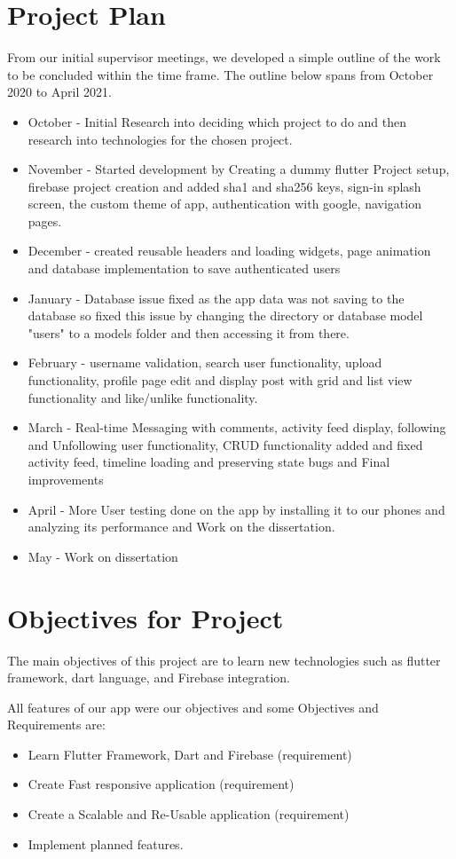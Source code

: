 \section{Project Plan}
From our initial supervisor meetings, we developed a simple outline of the work to be concluded within the time frame. The outline below spans from October 2020 to April 2021.
\begin{itemize}
\item October - Initial Research into deciding which project to do and then research into technologies for the chosen project.
\item November - Started development by Creating a dummy flutter Project setup, firebase project creation and added sha1 and sha256 keys, sign-in splash screen, the custom theme of app, authentication with google, navigation pages.
\item December - created reusable headers and loading widgets, page animation and database implementation to save authenticated users
\item January - Database issue fixed as the app data was not saving to the database so fixed this issue by changing the directory or database model "users" to a models folder and then accessing it from there.
\item February - username validation, search user functionality, upload functionality, profile page edit and display post with grid and list view functionality and like/unlike functionality.
\item March - Real-time Messaging with comments, activity feed display, following and Unfollowing user functionality, CRUD functionality added and fixed activity feed, timeline loading and preserving state bugs and Final improvements
\item April - More User testing done on the app by installing it to our phones and analyzing its performance and Work on the dissertation.
\item May - Work on dissertation
\end{itemize}

\section{Objectives for Project}
The main objectives of this project are to learn new technologies such as flutter framework, dart language, and Firebase integration.

All features of our app were our objectives and some Objectives and Requirements are:
\begin{itemize}
\item Learn Flutter Framework, Dart and Firebase (requirement)
\item Create Fast responsive application (requirement)
\item Create a Scalable and Re-Usable application (requirement)
\item Implement planned features.
\end{itemize}

